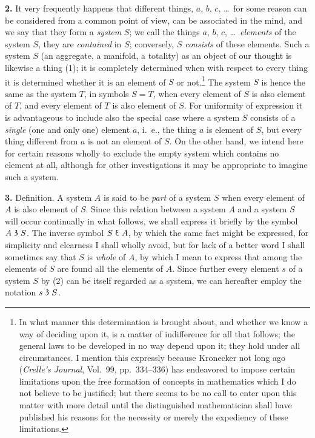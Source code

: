 \documentclass[oneside]{book}
\newcommand\partof{\mathrel{\raisebox{0.45ex}{$\mathfrak{3}$}}}   %
\newcommand\wholeof{\mathrel{\reflectbox{$\partof$}}}             %
\newcommand\mypara{\medskip\textbf}
\begin{document}
\mypara{2.} It very frequently happens that different things,
$a$, $b$, $c$, \ldots\ for some reason can be considered from
a common point of view, can be associated in the
mind, and we say that they form a \textit{system} $S$; we call
the things $a$, $b$, $c$, \ldots\ \textit{elements} of the system $S$, they
are \textit{contained} in $S$; conversely, $S$ \textit{consists} of these
elements. Such a system $S$ (an aggregate, a manifold,
a totality) as an object of our thought is likewise
a thing (1); it is completely determined when
with respect to every thing it is determined whether
it is an element of $S$ or not.\footnote
  {In what manner this determination is brought about, and whether we
know a way of deciding upon it, is a matter of indifference for all that follows;
the general laws to be developed in no way depend upon it; they hold under
all circumstances. I mention this expressly because Kronecker not long ago
(\textit{Crelle's Journal}, Vol.~99, pp.~334--336) has endeavored to impose certain limitations
upon the free formation of concepts in mathematics which I do not
believe to be justified; but there seems to be no call to enter upon this matter
with more detail until the distinguished mathematician shall have published
his reasons for the necessity or merely the expediency of these
  limitations.}
The system $S$ is hence
the same as the system $T$, in symbols $S=T$, when
every element of $S$ is also element of $T$, and every
element of $T$ is also element of $S$. For uniformity of
expression it is advantageous to include also the special
case where a system $S$ consists of a \textit{single} (one
and only one) element $a$, i.~e., the thing $a$ is element
of $S$, but every thing different from $a$ is not an element
of $S$. On the other hand, we intend here for
certain reasons wholly to exclude the empty system
which contains no element at all, although for other
investigations it may be appropriate to imagine such
a system.

\mypara{3.} Definition.  A system $A$ is said to be \textit{part} of a
system $S$ when every element of $A$ is also element of
$S$. Since this relation between a system $A$ and a system
$S$ will occur continually in what follows, we shall
express it briefly by the symbol $A \partof S$. The inverse
symbol $S \wholeof A$, by which the same fact might be expressed,
for simplicity and clearness I shall wholly
avoid, but for lack of a better word I shall sometimes
say that $S$ is \textit{whole} of $A$, by which I mean to express
that among the elements of $S$ are found all the elements
of $A$. Since further every element $s$ of a system
$S$ by (2) can be itself regarded as a system, we can
hereafter employ the notation $s \partof S$.
\end{document}
